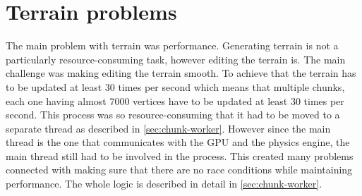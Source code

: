 \section{Terrain problems} \label{sec:terrain_problems}
The main problem with terrain was performance.
Generating terrain is not a particularly resource-consuming task, however editing the terrain is.
The main challenge was making editing the terrain smooth.
To achieve that the terrain has to be updated at least 30 times per second which means that multiple chunks, each one having almost 7000 vertices have to be updated at least 30 times per second.
This process was so resource-consuming that it had to be moved to a separate thread as described in \autoref{sec:chunk-worker}.
However since the main thread is the one that communicates with the GPU and the physics engine, the main thread still had to be involved in the process.
This created many problems connected with making sure that there are no race conditions while maintaining performance.
The whole logic is described in detail in \autoref{sec:chunk-worker}.